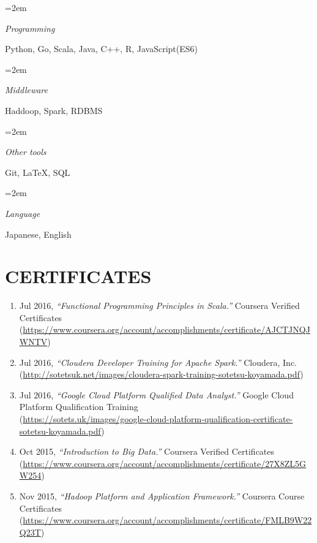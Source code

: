 \documentclass[paper=a4,fontsize=11pt]{scrartcl} %
\newlength{\spacebox}
\newcommand{\NewPart}[1]{\section*{\uppercase{#1}}}
\newcommand{\PersonalEntry}[2]{
		\noindent\hangindent=2em\hangafter=0 %
		\parbox{\spacebox}{        %
		\textit{#1}}		       %
		\hspace{1.5em} #2 \par}    %
\newcommand{\SkillsEntry}[2]{      %
		\noindent\hangindent=2em\hangafter=0 %
		\parbox{\spacebox}{        %
		\textit{#1}}			   %
		\hspace{1.5em} #2 \par}    %
\begin{document}

\SkillsEntry{Programming}{Python, Go, Scala, Java, C++, R, JavaScript(ES6)}
\SkillsEntry{Middleware}{Haddoop, Spark, RDBMS}
\SkillsEntry{Other tools}{Git, LaTeX, SQL}
\SkillsEntry{Language}{Japanese, English}

\NewPart{Certificates}{}

\begin{enumerate}
        \item Jul 2016, {\em ``Functional Programming Principles in Scala.''} Coursera Verified Certificates \\{\footnotesize (\url{https://www.coursera.org/account/accomplishments/certificate/AJCTJNQJWNTV})}
	\item Jul 2016, {\em ``Cloudera Developer Training for Apache Spark.''} Cloudera, Inc. \\{\footnotesize (\url{http://sotetsuk.net/images/cloudera-spark-training-sotetsu-koyamada.pdf})}
        \item Jul 2016, {\em ``Google Cloud Platform Qualified Data Analyst.''} Google Cloud Platform Qualification Training  \\{\footnotesize (\url{https://sotets.uk/images/google-cloud-platform-qualification-certificate-sotetsu-koyamada.pdf})}
	\item Oct 2015, {\em ``Introduction to Big Data.''} Coursera Verified Certificates \\{\footnotesize (\url{https://www.coursera.org/account/accomplishments/certificate/27X8ZL5GW254})}
	\item Nov 2015, {\em ``Hadoop Platform and Application Framework.''} Coursera Course Certificates \\{\footnotesize (\url{https://www.coursera.org/account/accomplishments/certificate/FMLB9W22Q23T})}
\end{enumerate}
\end{document}
